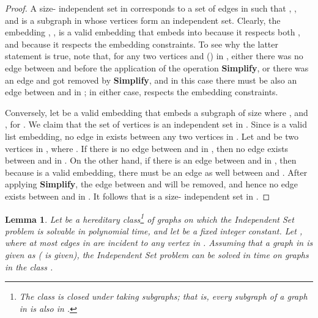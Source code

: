 \documentclass[11pt]{article}
\newtheorem{lemma}[theorem]{Lemma}
\begin{document}
\begin{proof}
A size- independent set  in  corresponds to a set of  edges  in  such that ,
, and  is a subgraph in  whose vertices form an independent set. Clearly, the embedding , , is a valid embedding that embeds  into  because it respects both , and because it respects the embedding constraints. To see why the latter statement is true, note that, for any two vertices  and  () in , either there was no edge between  and  before the application of the operation {\bf Simplify}, or there was an edge and got removed by {\bf Simplify}, and in this case there must be also an edge between  and  in ; in either case,  respects the embedding constraints.

Conversely, let  be a valid embedding that embeds a subgraph  of size  where , and , for . We claim that the set of vertices  is an independent set in . Since  is a valid list embedding, no edge in  exists between any two vertices in . Let  and  be two vertices in , where . If there is no edge between  and  in , then no edge exists between  and  in . On the other hand, if there is an edge between  and  in , then because  is a valid embedding, there must be an edge as well between  and . After applying {\bf Simplify}, the edge between  and  will be removed, and hence no edge exists between  and  in . It follows that  is a size- independent set in .\end{proof}

\begin{lemma}\label{lem:separation}
Let  be a hereditary class\footnote{The class  is closed under taking subgraphs; that is, every subgraph of a graph in  is also in .} of graphs on which the {\sc Independent Set} problem is solvable in polynomial time, and let  be a fixed integer constant. Let , where at most  edges in   are incident to any vertex in .  Assuming that a graph in  is given as  ( is given), the {\sc Independent Set} problem can be solved in  time on graphs in the class .
\end{lemma}
\end{document}

